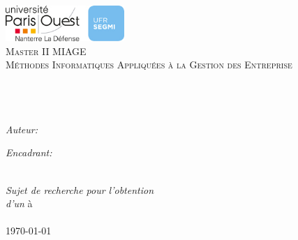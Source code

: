 \documentclass[11pt, oneside]{Thesis} %
\begin{document}
\begin{titlepage}
\begin{center}

\textsc{\LARGE \univname}\\[0.5cm] %
\includegraphics[width=4.5cm]{Logo}\\[0.5cm] %
\textsc{\Large Master II MIAGE}\\ %
\textsc{Méthodes Informatiques Appliquées à la Gestion des Entreprise}\\[0.5cm]

\HRule \\[0.4cm] %
{\huge \bfseries \ttitle}\\[0.4cm] %
\HRule \\[1.5cm] %
 
\begin{minipage}{0.4\textwidth}
\begin{flushleft} \large
\emph{Auteur:}\\
{\authornames} %
\end{flushleft}
\end{minipage}
\begin{minipage}{0.4\textwidth}
\begin{flushright} \large
\emph{Encadrant:} \\
\href{https://pages.lip6.fr/Pascal.Poizat}{\supname} %
\end{flushright}
\end{minipage}\\[3cm]
 
\large \textit{Sujet de recherche pour l'obtention\\ d'un \degreename} à\\[0.3cm] %
\deptname\\[2cm] %
 
{\large \today}\\[4cm] %
 
\vfill
\end{center}

\end{titlepage}
\end{document}
